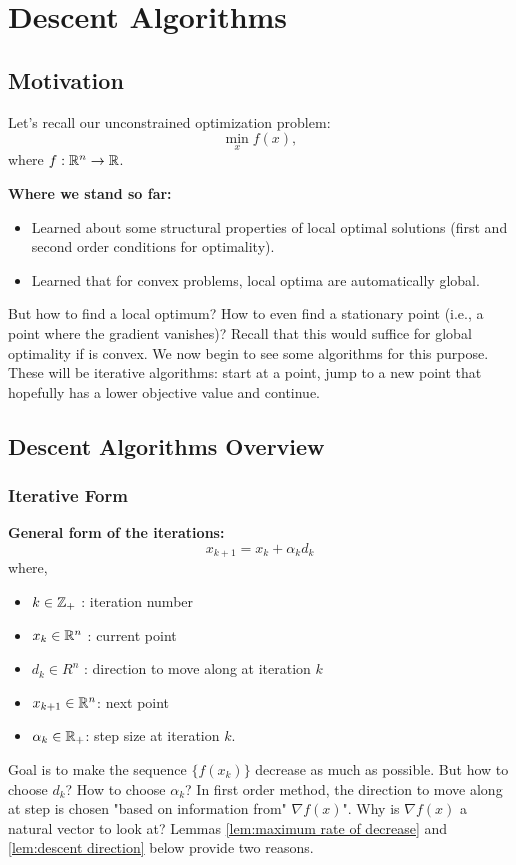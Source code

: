 \chapter{Descent Algorithms}\label{chp:descent algorithms}

\section{Motivation}

Let's recall our unconstrained optimization problem:
\begin{equation*}
    \min_{x} f(x), 
\end{equation*}
where $f:\mathbb{R}^n\rightarrow \mathbb{R}$.

\par
\noindent \textbf{Where we stand so far:}
\begin{itemize}
    \item Learned about some structural properties of local optimal solutions (first
    and second order conditions for optimality).
    \item Learned that for convex problems, local optima are automatically global.
\end{itemize}
\par 
But how to find a local optimum?
How to even find a stationary point (i.e., a point where the gradient
vanishes)? Recall that this would suffice for global optimality if is
convex.
We now begin to see some algorithms for this purpose. 
These will be iterative algorithms: start at a point, jump to a new point
that hopefully has a lower objective value and continue. 


\section{Descent Algorithms Overview}
\subsection{Iterative Form}
\noindent \textbf{General form of the iterations:}
\begin{equation*}
    x_{k+1} = x_k+\alpha_k d_k
\end{equation*}
\noindent where,
\begin{itemize}
    \item $k\in \mathbb{Z}_+$ : iteration number
    \item $x_k\in \mathbb{R}^n$ : current point
    \item $d_k\in R^n$ : direction to move along at iteration $k$
    \item $x_{k+1} \in \mathbb{R}^n$: next point
    \item $\alpha_k \in \mathbb{R}_+$: step size at iteration $k$.
\end{itemize}
\noindent Goal is to make the sequence $\{f(x_k)\}$
decrease as much as possible. But how to choose $d_k$? How to choose $\alpha_k$?
In first order method, the direction to move along at step is chosen
"based on information from" $\nabla f(x)$". Why is $\nabla f(x)$ a natural vector to look at? Lemmas \ref{lem:maximum rate of decrease} and \ref{lem:descent direction} below provide two reasons.


